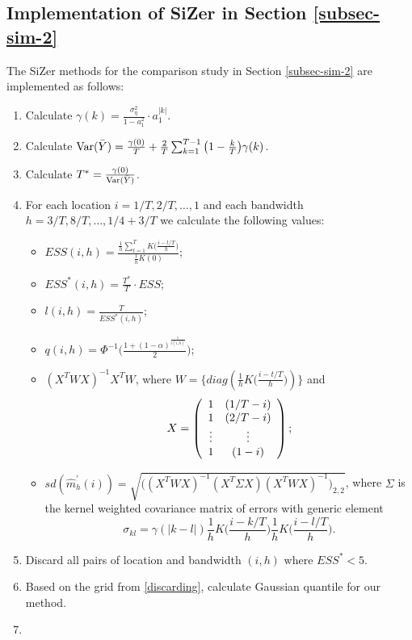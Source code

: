 \subsection*{Implementation of SiZer in Section \ref{subsec-sim-2}}


The SiZer methods for the comparison study in Section \ref{subsec-sim-2} are implemented as follows:
\begin{enumerate}
	\item Calculate $\gamma(k) = \frac{\sigma_\eta^2 }{1 - a_1^2}\cdot a_1^{|k|}$.
	\item Calculate $\textnormal{Var}(\bar{Y}) = \frac{\gamma(0)}{T} + \frac{2}{T} \sum_{k = 1}^{T-1} \big(1 - \frac{k}{T}\big)\gamma(k)$.
	\item Calculate $T^* = \frac{\gamma(0)}{\textnormal{Var}(\bar{Y})}$.
	\item For each location $i = 1/T, 2/T, \ldots, 1$ and each bandwidth $h = 3/T, 8/T,\ldots, 1/4 + 3/T$ we calculate the following values:
	\begin{itemize}
		\item $ESS(i, h) = \frac{\frac{1}{h}\sum_{t =1}^T K\big(\frac{i - t/T}{h}\big)}{\frac{1}{h}K(0)}$;
		\item $ESS^*(i, h) =\frac{T^*}{T} \cdot ESS$;
		\item $l(i, h) = \frac{T}{ESS^*(i, h)}$;
		\item $q(i, h) = \Phi^{-1} \Big(\frac{1 + (1 - \alpha)^{\frac{1}{l(i, h)}}}{2}\Big)$;
		\item $(X^T W X)^{-1} X^T W$, where $W = \{diag(\frac{1}{h} K\big(\frac{i - t/T}{h}\big))\}$ and 
			\begin{equation}
			X =  \left( \begin{array}{c c}
   					1 & (1/T - i) \\
					1 & (2/T - i)  \\
					\vdots & \vdots \\
					1 & (1 - i)  \\
				   \end{array} \right); \nonumber
			\end{equation}
		\item $sd(\widehat{m}^\prime_h(i)) = \sqrt{\big((X^T W X)^{-1} (X^T \Sigma X) (X^T W X)^{-1}\big)_{2, 2}}$, where $\Sigma$ is the kernel weighted covariance matrix of errors with generic element $$\sigma_{kl} = \gamma(|k - l|) \frac{1}{h} K\Big(\frac{i - k/T}{h}\Big) \frac{1}{h}  K\Big(\frac{i - l/T}{h}\Big).$$
	\end{itemize}
	\item\label{discarding} Discard all pairs of location and bandwidth $(i, h)$ where $ESS^* < 5$.
	\item Based on the grid from \ref{discarding}, calculate Gaussian quantile for our method.
	\item 
\end{enumerate}
